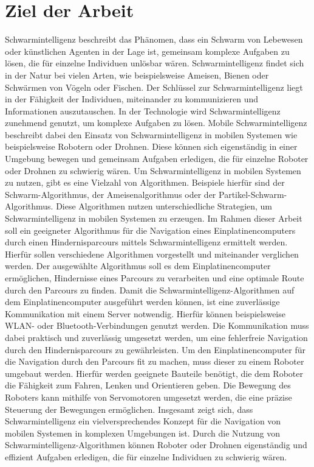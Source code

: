 \section{Ziel der Arbeit}
Schwarmintelligenz beschreibt das Phänomen, dass ein Schwarm von Lebewesen oder künstlichen Agenten in der Lage ist, gemeinsam komplexe Aufgaben zu lösen, die für einzelne Individuen unlösbar wären. Schwarmintelligenz findet sich in der Natur bei vielen Arten, wie beispielsweise Ameisen, Bienen oder Schwärmen von Vögeln oder Fischen. Der Schlüssel zur Schwarmintelligenz liegt in der Fähigkeit der Individuen, miteinander zu kommunizieren und Informationen auszutauschen.
In der Technologie wird Schwarmintelligenz zunehmend genutzt, um komplexe Aufgaben zu lösen. Mobile Schwarmintelligenz beschreibt dabei den Einsatz von Schwarmintelligenz in mobilen Systemen wie beispielsweise Robotern oder Drohnen. Diese können sich eigenständig in einer Umgebung bewegen und gemeinsam Aufgaben erledigen, die für einzelne Roboter oder Drohnen zu schwierig wären.
Um Schwarmintelligenz in mobilen Systemen zu nutzen, gibt es eine Vielzahl von Algorithmen. Beispiele hierfür sind der Schwarm-Algorithmus, der Ameisenalgorithmus oder der Partikel-Schwarm-Algorithmus. Diese Algorithmen nutzen unterschiedliche Strategien, um Schwarmintelligenz in mobilen Systemen zu erzeugen.
Im Rahmen dieser Arbeit soll ein geeigneter Algorithmus für die Navigation eines Einplatinencomputers durch einen Hindernisparcours mittels Schwarmintelligenz ermittelt werden. Hierfür sollen verschiedene Algorithmen vorgestellt und miteinander verglichen werden. Der ausgewählte Algorithmus soll es dem Einplatinencomputer ermöglichen, Hindernisse eines Parcours zu verarbeiten und eine optimale Route durch den Parcours zu finden.
Damit die Schwarmintelligenz-Algorithmen auf dem Einplatinencomputer ausgeführt werden können, ist eine zuverlässige Kommunikation mit einem Server notwendig. Hierfür können beispielsweise WLAN- oder Bluetooth-Verbindungen genutzt werden. Die Kommunikation muss dabei praktisch und zuverlässig umgesetzt werden, um eine fehlerfreie Navigation durch den Hindernisparcours zu gewährleisten.
Um den Einplatinencomputer für die Navigation durch den Parcours fit zu machen, muss dieser zu einem Roboter umgebaut werden. Hierfür werden geeignete Bauteile benötigt, die dem Roboter die Fähigkeit zum Fahren, Lenken und Orientieren geben. Die Bewegung des Roboters kann mithilfe von Servomotoren umgesetzt werden, die eine präzise Steuerung der Bewegungen ermöglichen.
Insgesamt zeigt sich, dass Schwarmintelligenz ein vielversprechendes Konzept für die Navigation von mobilen Systemen in komplexen Umgebungen ist. Durch die Nutzung von Schwarmintelligenz-Algorithmen können Roboter oder Drohnen eigenständig und effizient Aufgaben erledigen, die für einzelne Individuen zu schwierig wären.

